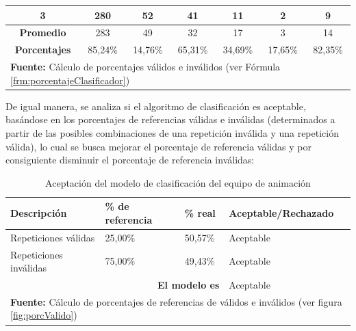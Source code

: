 \begin{table}[H]
\begin{center}
\begin{tabular}{|c|c|c|c|c|c|c|}
3                    & 280                                                                   & 52                                                             & 41                                               & 11                                                & 2                                                                      & 9                                                                      \\ \hline
\textbf{Promedio}    & 283                                                                   & 49                                                             & 32                                               & 17                                                & 3                                                                      & 14                                                                     \\ \hline
\textbf{Porcentajes} & 85,24\%                                                               & 14,76\%                                                        & 65,31\%                                          & 34,69\%                                           & 17,65\%                                                                & 82,35\%                                                                \\ \hline
\multicolumn{7}{l}{\textbf{Fuente:} C\'alculo de porcentajes v\'alidos e inv\'alidos (ver F\'ormula \ref{frm:porcentajeClasificador})}
\end{tabular}
\end{center}
\end{table}
De igual manera, se analiza si el algoritmo de clasificaci\'on es aceptable, bas\'andose en los porcentajes de referencias v\'alidas e inv\'alidas (determinados a partir de las posibles combinaciones de una repetici\'on inv\'alida y una repetici\'on v\'alida), lo cual se busca mejorar el porcentaje de referencia v\'alidas y por  consiguiente disminuir el porcentaje de referencia inv\'alidas:
\begin{table}[H]
\begin{center}
\caption{Aceptaci\'on del modelo de clasificaci\'on del equipo de animaci\'on}
\label{tab:acModAni}
\begin{tabular}{|l|l|l|l|}
\hline
\textbf{Descripci\'on} & \textbf{\% de referencia} & \textbf{\% real} & \textbf{Aceptable/Rechazado} \\ \hline
Repeticiones v\'alidas              & 25,00\%                   & 50,57\%          & Aceptable                    \\ \hline
Repeticiones inv\'alidas            & 75,00\%                   & 49,43\%          & Aceptable                    \\ \hline
\multicolumn{3}{|r|}{\textbf{El modelo es}}                         & Aceptable                    \\ \hline 
\multicolumn{4}{l}{\textbf{Fuente:} C\'alculo de porcentajes de referencias de v\'alidos e inv\'alidos (ver figura  \ref{fig:porcValido})}
\end{tabular}
\end{center}
\end{table}
